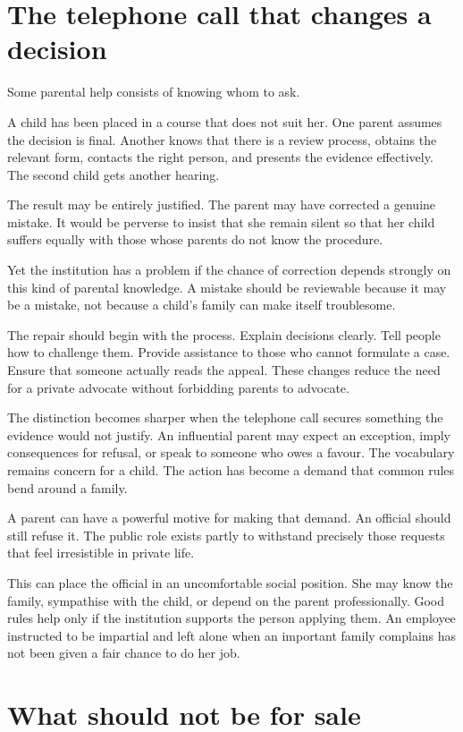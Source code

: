 \documentclass[12pt,a4paper]{book}
\begin{document}
\section*{The telephone call that changes a decision}

Some parental help consists of knowing whom to ask.

A child has been placed in a course that does not suit her. One parent assumes the decision is final. Another knows that there is a review process, obtains the relevant form, contacts the right person, and presents the evidence effectively. The second child gets another hearing.

The result may be entirely justified. The parent may have corrected a genuine mistake. It would be perverse to insist that she remain silent so that her child suffers equally with those whose parents do not know the procedure.

Yet the institution has a problem if the chance of correction depends strongly on this kind of parental knowledge. A mistake should be reviewable because it may be a mistake, not because a child's family can make itself troublesome.

The repair should begin with the process. Explain decisions clearly. Tell people how to challenge them. Provide assistance to those who cannot formulate a case. Ensure that someone actually reads the appeal. These changes reduce the need for a private advocate without forbidding parents to advocate.

The distinction becomes sharper when the telephone call secures something the evidence would not justify. An influential parent may expect an exception, imply consequences for refusal, or speak to someone who owes a favour. The vocabulary remains concern for a child. The action has become a demand that common rules bend around a family.

A parent can have a powerful motive for making that demand. An official should still refuse it. The public role exists partly to withstand precisely those requests that feel irresistible in private life.

This can place the official in an uncomfortable social position. She may know the family, sympathise with the child, or depend on the parent professionally. Good rules help only if the institution supports the person applying them. An employee instructed to be impartial and left alone when an important family complains has not been given a fair chance to do her job.

\section*{What should not be for sale}
\end{document}
